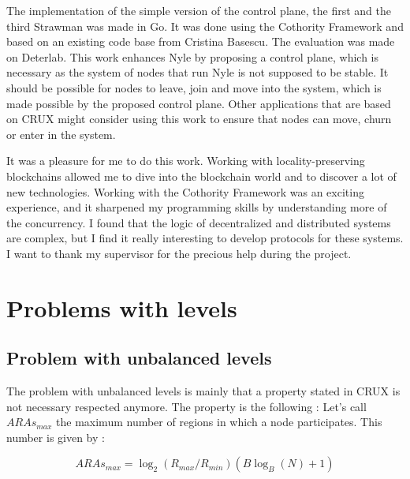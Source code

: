 \documentclass[a4paper,11pt,oneside]{report}
\begin{document}

The implementation of the simple version of the control plane, the first and
the third Strawman was made in Go. It was done using the Cothority Framework
and based on an existing code base from Cristina Basescu. The evaluation was
made on Deterlab. This work enhances Nyle by proposing a control plane, which
is necessary as the system of nodes that run Nyle is not supposed to be
stable. It should be possible for nodes to leave, join and move into the
system, which is made possible by the proposed control plane. Other
applications that are based on CRUX \cite{Basescu2014} might consider using
this work to ensure that nodes can move, churn or enter in the system.

It was a pleasure for me to do this work. Working with locality-preserving
blockchains allowed me to dive into the blockchain world and to discover a lot
of new technologies. Working with the Cothority Framework was an exciting
experience, and it sharpened my programming skills by understanding more of the
concurrency. I found that the logic of decentralized and distributed systems
are complex, but I find it really interesting to develop protocols for these
systems. I want to thank my supervisor for the precious help during the
project.


\cleardoublepage {} {}
\printbibliography


\appendix %

\chapter{Problems with levels}

\section{Problem with unbalanced levels } \label{app:unbalanced-levels}
The problem with unbalanced levels is mainly that a property stated in CRUX
\cite{Basescu2014} is not necessary respected anymore. The property is the
following : Let's call $ARAs_{max}$ the maximum number of regions in which a
node participates. This number is given by : 

\begin{equation} \label{eq:ARAmax}
ARAs_{max} = \log_2(R_{max}/R_{min}) (B \log_B(N)+1)
\end{equation}
\end{document}
